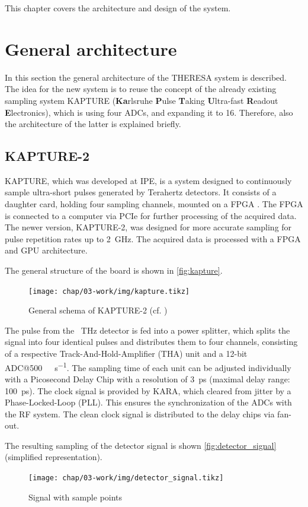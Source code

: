 This chapter covers the architecture and design of the system.
\section{General architecture}
In this section the general architecture of the THERESA system is described.
The idea for the new system is to reuse the concept of the already existing sampling system KAPTURE (\textbf{Ka}rlsruhe \textbf{P}ulse \textbf{T}aking \textbf{U}ltra-fast \textbf{R}eadout \textbf{E}lectronics), which is using four ADCs, and expanding it to 16. Therefore, also the architecture of the latter is explained briefly.
\subsection{KAPTURE-2}
KAPTURE, which was developed at IPE, is a system designed to continuously sample ultra-short pulses generated by Terahertz detectors. It consists of a daughter card, holding four sampling channels, mounted on a FPGA . The FPGA is connected to a computer via PCIe for further processing of the acquired data. \cite{brosi} 
The newer version, KAPTURE-2, was designed for more accurate sampling for pulse repetition rates up to \SI{2}{\giga \hertz}. The acquired data is processed with a FPGA and GPU architecture.  \cite{caselleKAP}

The general structure of the board is shown in \autoref{fig:kapture}.
\begin{figure}[H]
	\centering
	\texttt{[image: chap/03-work/img/kapture.tikz]}
	\caption{General schema of KAPTURE-2 (cf. \cite[p.2]{caselleKAP})}
	\label{fig:kapture}
\end{figure}
The pulse from the \SI{}{\tera \hertz} detector is fed into a power splitter, which splits the signal into four identical pulses and distributes them to four channels, consisting of a respective Track-And-Hold-Amplifier (THA) unit and a 12-bit ADC@\SI{500}{\mega\sample\per\second}. The sampling time of each unit can be adjusted individually with a Picosecond Delay Chip with a resolution of \SI{3}{\pico \second} (maximal delay range: \SI{100}{\pico \second}). 
The clock signal is provided by KARA, which cleared from jitter by a Phase-Locked-Loop (PLL). This ensures the synchronization of the ADCs with the RF system. The clean clock signal is distributed to the delay chips via fan-out. \cite{caselleKAP}

The resulting sampling of the detector signal is shown \autoref{fig:detector_signal} (simplified representation).
\begin{figure}[H]
	\centering
	\texttt{[image: chap/03-work/img/detector\_signal.tikz]}
	\caption{Signal with sample points}
	\label{fig:detector_signal}
\end{figure}

